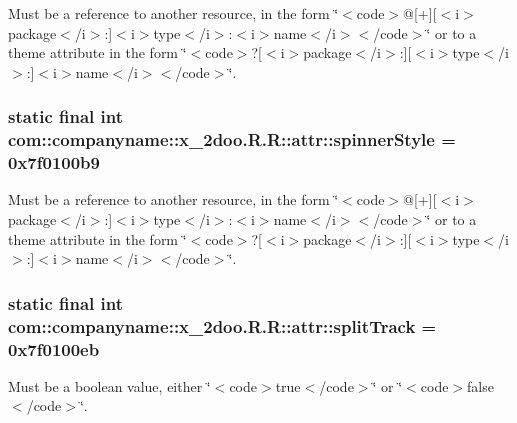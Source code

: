 Must be a reference to another resource, in the form \char`\"{}$<$code$>$@\mbox{[}+\mbox{]}\mbox{[}$<$i$>$package$<$/i$>$:\mbox{]}$<$i$>$type$<$/i$>$:$<$i$>$name$<$/i$>$$<$/code$>$\char`\"{} or to a theme attribute in the form \char`\"{}$<$code$>$?\mbox{[}$<$i$>$package$<$/i$>$:\mbox{]}\mbox{[}$<$i$>$type$<$/i$>$:\mbox{]}$<$i$>$name$<$/i$>$$<$/code$>$\char`\"{}. \hypertarget{classcom_1_1companyname_1_1x__2doo_1_1_r_1_1attr_a9aed97714f8f40785c265abfe64e770}{
\subsubsection[{spinnerStyle}]{\setlength{\rightskip}{0pt plus 5cm}static final int com::companyname::x\_\-2doo.R.R::attr::spinnerStyle = 0x7f0100b9}}
\label{classcom_1_1companyname_1_1x__2doo_1_1_r_1_1attr_a9aed97714f8f40785c265abfe64e770}


Must be a reference to another resource, in the form \char`\"{}$<$code$>$@\mbox{[}+\mbox{]}\mbox{[}$<$i$>$package$<$/i$>$:\mbox{]}$<$i$>$type$<$/i$>$:$<$i$>$name$<$/i$>$$<$/code$>$\char`\"{} or to a theme attribute in the form \char`\"{}$<$code$>$?\mbox{[}$<$i$>$package$<$/i$>$:\mbox{]}\mbox{[}$<$i$>$type$<$/i$>$:\mbox{]}$<$i$>$name$<$/i$>$$<$/code$>$\char`\"{}. \hypertarget{classcom_1_1companyname_1_1x__2doo_1_1_r_1_1attr_f127297c68f0c2b75d807ff3c5c3ceba}{
\subsubsection[{splitTrack}]{\setlength{\rightskip}{0pt plus 5cm}static final int com::companyname::x\_\-2doo.R.R::attr::splitTrack = 0x7f0100eb}}
\label{classcom_1_1companyname_1_1x__2doo_1_1_r_1_1attr_f127297c68f0c2b75d807ff3c5c3ceba}


Must be a boolean value, either \char`\"{}$<$code$>$true$<$/code$>$\char`\"{} or \char`\"{}$<$code$>$false$<$/code$>$\char`\"{}. 

